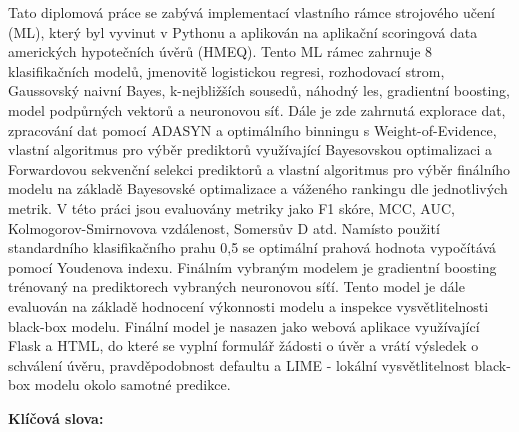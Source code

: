 Tato diplomov\'{a} pr\'{a}ce se zab\'{y}v\'{a} implementac\'{i} vlastn\'{i}ho r\'{a}mce strojov\'{e}ho u\v{c}en\'{i} (ML), kter\'{y} byl vyvinut v Pythonu a aplikov\'{a}n na aplika\v{c}n\'{i} scoringov\'{a} data americk\'{y}ch hypote\v{c}n\'{i}ch \'{u}v\v{e}r\r{u} (HMEQ).
Tento ML r\'{a}mec zahrnuje 8 klasifika\v{c}n\'{i}ch model\r{u}, jmenovit\v{e} logistickou regresi, rozhodovac\'{i} strom, Gaussovsk\'{y} naivn\'{i} Bayes, k-nejbli\v{z}\v{s}\'{i}ch soused\r{u}, n\'{a}hodn\'{y} les, gradientn\'{i} boosting, model podp\r{u}rn\'{y}ch vektor\r{u} a neuronovou s\'{i}\v{t}.
D\'{a}le je zde zahrnut\'{a} explorace dat, zpracov\'{a}n\'{i} dat pomoc\'{i} ADASYN a optim\'{a}ln\'{i}ho binningu s Weight-of-Evidence, vlastn\'{i} algoritmus pro v\'{y}b\v{e}r prediktor\r{u} vyu\v{z}\'{i}vaj\'{i}c\'{i} Bayesovskou optimalizaci a Forwardovou sekven\v{c}n\'{i} selekci prediktor\r{u} a
vlastn\'{i} algoritmus pro v\'{y}b\v{e}r fin\'{a}ln\'{i}ho modelu na z\'{a}klad\v{e} Bayesovsk\'{e} optimalizace a v\'{a}\v{z}en\'{e}ho rankingu dle jednotliv\'{y}ch metrik. V t\'{e}to pr\'{a}ci jsou evaluov\'{a}ny metriky jako F1 sk\'{o}re, MCC, AUC, Kolmogorov-Smirnovova vzd\'{a}lenost, Somers\r{u}v D atd.
Nam\'{i}sto pou\v{z}it\'{i} standardn\'{i}ho klasifika\v{c}n\'{i}ho prahu 0,5 se optim\'{a}ln\'{i} prahov\'{a} hodnota vypo\v{c}\'{i}t\'{a}v\'{a} pomoc\'{i} Youdenova indexu.
Fin\'{a}ln\'{i}m vybran\'{y}m modelem je gradientn\'{i} boosting tr\'{e}novan\'{y} na prediktorech vybran\'{y}ch neuronovou s\'{i}\v{t}\'{i}.
Tento model je d\'{a}le evaluov\'{a}n na z\'{a}klad\v{e} hodnocen\'{i} v\'{y}konnosti modelu a inspekce vysv\v{e}tlitelnosti black-box modelu.
Fin\'{a}ln\'{i} model je nasazen jako webov\'{a} aplikace vyu\v{z}\'{i}vaj\'{i}c\'{i} Flask a HTML, do kter\'{e} se vypln\'{i} formul\'{a}\v{r} \v{z}\'{a}dosti o \'{u}v\v{e}r a vr\'{a}t\'{i} v\'{y}sledek o schv\'{a}len\'{i} \'{u}v\v{e}ru, pravd\v{e}podobnost defaultu a LIME - lok\'{a}ln\'{i} vysv\v{e}tlitelnost black-box modelu okolo samotn\'{e} predikce.

\bigskip

\textbf{Kl\'{i}\v{c}ov\'{a} slova:} \Klic

